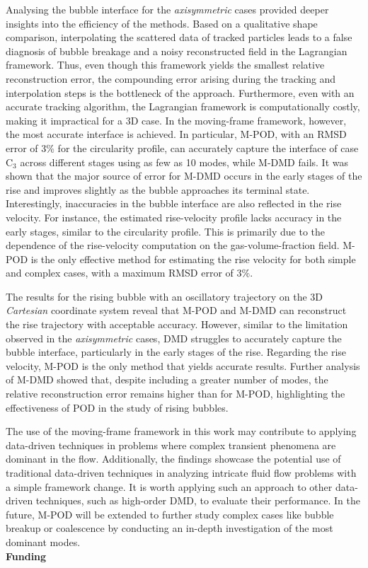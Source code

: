 \documentclass[a4paper,fleqn]{cas-sc}
\begin{document}
	Analysing the bubble interface for the \textit{axisymmetric} cases provided deeper insights into the efficiency of the methods. Based on a qualitative shape comparison, interpolating the scattered data of tracked particles leads to a false diagnosis of bubble breakage and a noisy reconstructed field in the Lagrangian framework. Thus, even though this framework yields the smallest relative reconstruction error, the compounding error arising during the tracking and interpolation steps is the bottleneck of the approach. Furthermore, even with an accurate tracking algorithm, the Lagrangian framework is computationally costly, making it impractical for a 3D case. In the moving-frame framework, however, the most accurate interface is achieved. In particular, M-POD, with an RMSD error of 3\% for the circularity profile, can accurately capture the interface of case C$_3$ across different stages using as few as 10 modes, while M-DMD fails. It was shown that the major source of error for M-DMD occurs in the early stages of the rise and improves slightly as the bubble approaches its terminal state. Interestingly, inaccuracies in the bubble interface are also reflected in the rise velocity. For instance, the estimated rise-velocity profile lacks accuracy in the early stages, similar to the circularity profile. This is primarily due to the dependence of the rise-velocity computation on the gas-volume-fraction field. M-POD is the only effective method for estimating the rise velocity for both simple and complex cases, with a maximum RMSD error of 3\%.
	
	The results for the rising bubble with an oscillatory trajectory on the 3D \textit{Cartesian} coordinate system reveal that M-POD and M-DMD can reconstruct the rise trajectory with acceptable accuracy. However, similar to the limitation observed in the \textit{axisymmetric} cases, DMD struggles to accurately capture the bubble interface, particularly in the early stages of the rise. Regarding the rise velocity, M-POD is the only method that yields accurate results. Further analysis of M-DMD showed that, despite including a greater number of modes, the relative reconstruction error remains higher than for M-POD, highlighting the effectiveness of POD in the study of rising bubbles.
	
	The use of the moving-frame framework in this work may contribute to applying data-driven techniques in problems where complex transient phenomena are dominant in the flow. Additionally, the findings showcase the potential use of traditional data-driven techniques in analyzing intricate fluid flow problems with a simple framework change. It is worth applying such an approach to other data-driven techniques, such as high-order DMD, to evaluate their performance.  In the future, M-POD will be extended to further study complex cases like bubble breakup or coalescence by conducting an in-depth investigation of the most dominant modes. \\
	{\noindent \bf{Funding}} \\
	
\end{document}
